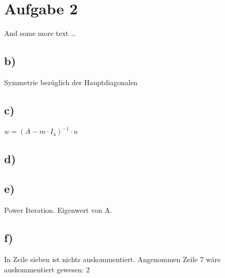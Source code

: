 \documentclass[10pt,a4paper]{article}
\begin{document}
 
\section*{Aufgabe 2}
And some more text \ldots

\subsection*{b)}
Symmetrie bezüglich der Hauptdiagonalen
\subsection*{c)}
$w = (A - m \cdot I_4)^{-1} \cdot u$
\subsection*{d)}

\subsection*{e)}
Power Iteration.
Eigenwert von A.
\subsection*{f)}
In Zeile sieben ist nichts auskommentiert.
Angenommen Zeile 7 wäre auskommentiert gewesen:
2
\end{document}
